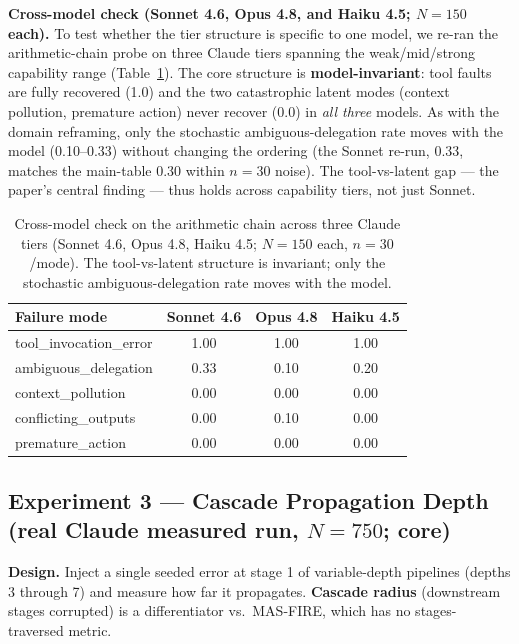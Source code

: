 \documentclass[sigconf,nonacm,anonymous]{acmart}  %
\begin{document}
\textbf{Cross-model check (Sonnet 4.6, Opus 4.8, and Haiku 4.5; $N{=}150$ each).}
To test whether the tier structure is specific to one model, we re-ran the
arithmetic-chain probe on three Claude tiers spanning the weak/mid/strong
capability range (Table~\ref{tab:crossmodel}). The core structure is
\textbf{model-invariant}: tool faults are fully recovered (1.0) and the two
catastrophic latent modes (context pollution, premature action) never recover
(0.0) in \emph{all three} models. As with the domain reframing, only the
stochastic ambiguous-delegation rate moves with the model (0.10--0.33) without
changing the ordering (the Sonnet re-run, 0.33, matches the main-table 0.30
within $n{=}30$ noise). The tool-vs-latent gap --- the paper's central finding
--- thus holds across capability tiers, not just Sonnet.

\begin{table}[t]
\centering
\caption{Cross-model check on the arithmetic chain across three Claude tiers
(Sonnet 4.6, Opus 4.8, Haiku 4.5; $N{=}150$ each, $n{=}30$/mode). The
tool-vs-latent structure is invariant; only the stochastic ambiguous-delegation
rate moves with the model.}
\label{tab:crossmodel}
\small
\begin{tabular}{@{}lccc@{}}
\toprule
\textbf{Failure mode} & \textbf{Sonnet 4.6} & \textbf{Opus 4.8} & \textbf{Haiku 4.5} \\
\midrule
tool\_invocation\_error & 1.00 & 1.00 & 1.00 \\
ambiguous\_delegation & 0.33 & 0.10 & 0.20 \\
context\_pollution & 0.00 & 0.00 & 0.00 \\
conflicting\_outputs & 0.00 & 0.10 & 0.00 \\
premature\_action & 0.00 & 0.00 & 0.00 \\
\bottomrule
\end{tabular}
\end{table}

\subsection{Experiment 3 --- Cascade Propagation Depth (real Claude measured run,
$N{=}750$; core)}
\textbf{Design.} Inject a single seeded error at stage 1 of variable-depth
pipelines (depths 3 through 7) and measure how far it propagates. \textbf{Cascade
radius} (downstream stages corrupted) is a differentiator vs.\ MAS-FIRE,
which has no stages-traversed metric.
\end{document}
